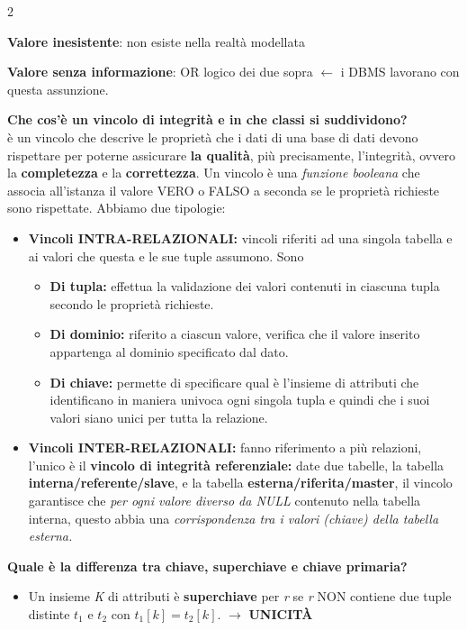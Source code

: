 \documentclass{article}
\newcommand{\sitemize}[1]{%
  \begin{itemize}[label=$\diamond$]
    #1
  \end{itemize}
}
\begin{document}
\begin{multicols}{2}
\begin{enumerate}[leftmargin=*, align=left]
{			\item \textbf{Valore inesistente}: non esiste nella realtà modellata
			\item \textbf{Valore senza informazione}: OR logico dei due sopra $\leftarrow$ i DBMS lavorano con questa assunzione.}
		
		\item \textbf{Che cos'è un vincolo di integrità e in che classi si suddividono?}\\
		 è un vincolo che descrive le proprietà che i dati di una base di dati devono rispettare per poterne assicurare \textbf{la qualità}, più precisamente, l'integrità, ovvero la \textbf{completezza} e la \textbf{correttezza}. Un vincolo è una \textit{funzione booleana} che associa all'istanza il valore VERO o FALSO a seconda se le proprietà richieste sono rispettate. Abbiamo due tipologie: 
		\sitemize{\item \textbf{Vincoli INTRA-RELAZIONALI:} vincoli riferiti ad una singola tabella e ai valori che questa e le sue tuple assumono. Sono \begin{itemize}
				\item \textbf{Di tupla:} effettua la validazione dei valori contenuti in ciascuna tupla secondo le proprietà richieste.
				\item \textbf{Di dominio:} riferito a ciascun valore, verifica che il valore inserito appartenga al dominio specificato dal dato.
				\item \textbf{Di chiave:} permette di specificare qual è l’insieme di attributi che identificano in maniera univoca ogni singola tupla e quindi che i suoi valori siano unici per tutta la relazione.
		\end{itemize}
		\item \textbf{Vincoli INTER-RELAZIONALI:} fanno riferimento a più relazioni, l'unico è il \textbf{vincolo di integrità referenziale:} date due tabelle, la tabella \textbf{interna/referente/slave}, e la tabella \textbf{esterna/riferita/master}, il vincolo garantisce che \textit{per ogni valore diverso da NULL} contenuto nella tabella interna, questo abbia una \textit{corrispondenza tra i valori (chiave) della tabella esterna.}
	} 
	
	\item \textbf{Quale è la differenza tra chiave, superchiave e chiave primaria?}
	\sitemize{
		\item Un insieme \textit{K} di attributi è \textbf{superchiave} per \textit{r} se \textit{r} NON contiene due tuple distinte $t_1$ e $t_2$ con $t_1[k] = t_2[k]$. $\rightarrow$ \textbf{UNICITÀ}
		
}
\end{enumerate}
\end{multicols}
\end{document}
